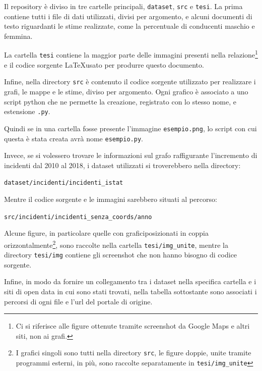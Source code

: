\documentclass[a4paper,12pt]{report}
\newcommand{\columnstyle}[1]{\texttt{#1}}
\newcommand{\filenamestyle}[1]{\texttt{#1}}
\newcommand{\skipline}{\vspace{0.2in}}
\begin{document}
Il repository è diviso in tre cartelle principali, \filenamestyle{dataset}, \filenamestyle{src} 
e \filenamestyle{tesi}. La prima contiene tutti i file di dati utilizzati, divisi per 
argomento, e alcuni documenti di testo riguardanti le stime realizzate, come la percentuale di 
conducenti maschio e femmina. 

La cartella \columnstyle{tesi}
 contiene la maggior parte delle immagini presenti 
nella relazione\footnote{Ci si riferisce alle figure ottenute tramite screenshot 
da Google Maps e altri siti, non ai grafi.} 
e il codice sorgente \LaTeX usato per produrre questo documento.

Infine, nella directory \filenamestyle{src} è contenuto il codice sorgente utilizzato 
per realizzare i grafi, le mappe e le stime, diviso per argomento. 
Ogni grafico è associato a uno script python che ne permette la creazione, registrato con 
lo stesso nome, e estensione \filenamestyle{.py}. 

Quindi se in una cartella fosse presente l'immagine \filenamestyle{esempio.png}, lo script con 
cui questa è stata creata avrà nome \filenamestyle{esempio.py}. 

Invece, se si volessero trovare le informazioni sul grafo raffigurante 
l'incremento di incidenti 
dal 2010 al 2018, i dataset utilizzati si troverebbero nella directory:

\skipline
\indent\filenamestyle{dataset/incidenti/incidenti\_istat}

\skipline
\noindent Mentre il codice sorgente e le immagini sarebbero situati al percorso:

\skipline
\indent\filenamestyle{src/incidenti/incidenti\_senza\_coords/anno}

\skipline
Alcune figure, in particolare quelle con graficiposizionati in coppia 
orizzontalmente\footnote{I grafici singoli sono tutti nella directory \filenamestyle{src}, 
le figure doppie, unite tramite programmi esterni, in più, sono raccolte separatamente 
in \filenamestyle{tesi/img\_unite}}, 
sono raccolte nella cartella \filenamestyle{tesi/img\_unite}, 
mentre la directory \filenamestyle{tesi/img} contiene gli screenshot 
che non hanno bisogno di codice sorgente. 

Infine, in modo da fornire un collegamento tra i dataset nella specifica cartella e i siti 
di open data in cui sono stati trovati, nella tabella sottostante sono associati i percorsi di 
ogni file e l'url del portale di origine. 
\end{document}
